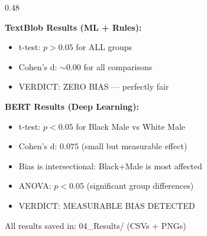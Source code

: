\documentclass[aspectratio=43,11pt]{beamer}
\begin{document}
\begin{frame}[t]
\begin{columns}[T]
\begin{column}{0.48\textwidth}
{\textbf{TextBlob Results (ML + Rules):}
\begin{itemize}
  \item t-test: $p > 0.05$ for ALL groups
  \item Cohen's d: ${\sim}0.00$ for all comparisons
  \item VERDICT: ZERO BIAS --- perfectly fair
\end{itemize}

\textbf{BERT Results (Deep Learning):}
\begin{itemize}
  \item t-test: $p < 0.05$ for Black Male vs White Male
  \item Cohen's d: $0.075$ (small but measurable effect)
  \item Bias is intersectional: Black+Male is most affected
  \item ANOVA: $p < 0.05$ (significant group differences)
  \item VERDICT: MEASURABLE BIAS DETECTED
\end{itemize}

All results saved in: 04\_Results/ (CSVs + PNGs)
}
\end{column}
\end{columns}
\end{frame}
\end{document}

